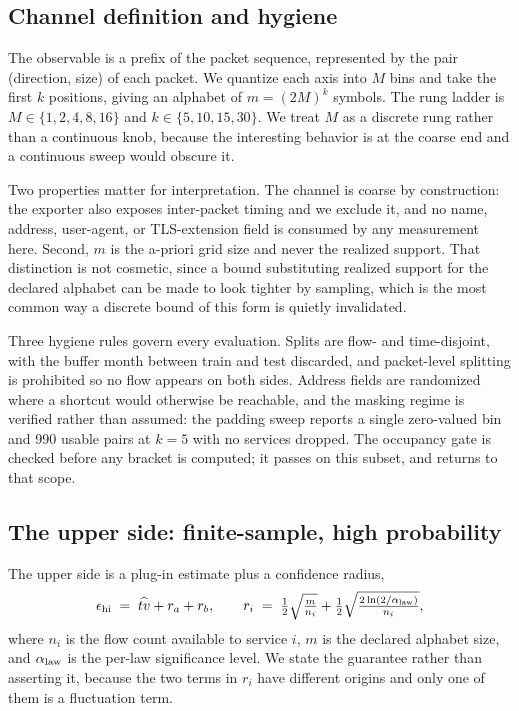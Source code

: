 \subsection{Channel definition and hygiene}
\label{sec:design/channel}

The observable is a prefix of the packet sequence, represented by the pair
(direction, size) of each packet. We quantize each axis into $M$ bins and take
the first $k$ positions, giving an alphabet of $m = (2M)^k$ symbols. The rung
ladder is $M \in \{1,2,4,8,16\}$ and $k \in \{5,10,15,30\}$. We treat $M$ as a
discrete rung rather than a continuous knob, because the interesting behavior is
at the coarse end and a continuous sweep would obscure it.

Two properties matter for interpretation. The channel is coarse by
construction: the exporter also exposes inter-packet timing and we exclude it,
and no name, address, user-agent, or TLS-extension field is consumed by any
measurement here. Second, $m$ is the a-priori grid size and never the realized
support. That distinction is not cosmetic, since a bound substituting realized
support for the declared alphabet can be made to look tighter by sampling, which
is the most common way a discrete bound of this form is quietly invalidated.

Three hygiene rules govern every evaluation. Splits are flow- and
time-disjoint, with the buffer month between train and test discarded, and
packet-level splitting is prohibited so no flow appears on both sides. Address
fields are randomized where a shortcut would otherwise be reachable, and the
masking regime is verified rather than assumed: the padding sweep reports a
single zero-valued bin and 990 usable pairs at $k{=}5$ with no services dropped.
The occupancy gate is checked before any bracket is computed; it passes on this
subset, and  returns to that scope.

\subsection{The upper side: finite-sample, high probability}
\label{sec:design/upper}

The upper side is a plug-in estimate plus a confidence radius,
\begin{equation}
  \epsilon_{\mathrm{hi}} \;=\; \widehat{tv} + r_a + r_b, \qquad
  r_i \;=\; \tfrac{1}{2}\sqrt{\tfrac{m}{n_i}}
        + \tfrac{1}{2}\sqrt{\tfrac{2\ln(2/\alpha_{\mathrm{law}})}{n_i}},
  \label{eq:upper}
\end{equation}
where $n_i$ is the flow count available to service $i$, $m$ is the declared
alphabet size, and $\alpha_{\mathrm{law}}$ is the per-law significance level. We state the
guarantee rather than asserting it, because the two terms in $r_i$ have
different origins and only one of them is a fluctuation term.

